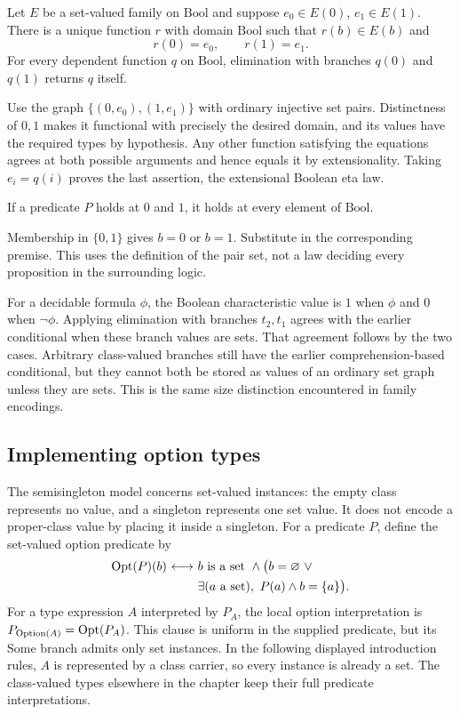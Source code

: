 \begin{theorem}
Let $E$ be a set-valued family on $\mathrm{Bool}$ and suppose
$e_0\in E(0)$, $e_1\in E(1)$. There is a unique function $r$ with
domain $\mathrm{Bool}$ such that $r(b)\in E(b)$ and
\[
r(0)=e_0,\qquad r(1)=e_1.
\]
For every dependent function $q$ on $\mathrm{Bool}$, elimination with
branches $q(0)$ and $q(1)$ returns $q$ itself.
\end{theorem}
\Proof
Use the graph $\{(0,e_0),(1,e_1)\}$ with ordinary injective set pairs.
Distinctness of $0,1$ makes it functional with precisely the desired
domain, and its values have the required types by hypothesis.
Any other function satisfying the equations agrees at both possible
arguments and hence equals it by extensionality. Taking $e_i=q(i)$
proves the last assertion, the extensional Boolean eta law.
\Done

\begin{corollary}
If a predicate $P$ holds at $0$ and $1$, it holds at every element of
$\mathrm{Bool}$.
\end{corollary}
\Proof
Membership in $\{0,1\}$ gives $b=0$ or $b=1$. Substitute in the
corresponding premise. This uses the definition of the pair set, not a
law deciding every proposition in the surrounding logic.
\Done

For a decidable formula $\phi$, the Boolean characteristic value is $1$
when $\phi$ and $0$ when $\neg\phi$. Applying elimination with branches
$t_2,t_1$ agrees with the earlier conditional when these branch values
are sets. That agreement follows by the two cases. Arbitrary class-valued
branches still have the earlier comprehension-based conditional, but they
cannot both be stored as values of an ordinary set graph unless they are
sets. This is the same size distinction encountered in family encodings.

\subsection{Implementing option types}
The semisingleton model concerns set-valued instances: the empty class
represents no value, and a singleton represents one set value. It does
not encode a proper-class value by placing it inside a singleton.
For a predicate $P$, define the set-valued option predicate by
\[
\begin{split}
\operatorname{Opt}(P)(b){\ \longleftrightarrow\ }{}& b\text{ is a set}\ \land\bigl(
 b=\varnothing\ \lor\\
&\exists(a\text{ a set}),\ P(a)\land b=\{a\}\bigr).
\end{split}
\]
For a type expression $A$ interpreted by $P_A$, the local option
interpretation is $P_{\mathrm{Option}(A)}=\operatorname{Opt}(P_A)$.
This clause is uniform in the supplied predicate, but its Some branch
admits only set instances. In the following displayed introduction rules,
$A$ is represented by a class carrier, so every instance is already a
set. The class-valued types elsewhere in the chapter keep their full
predicate interpretations.

